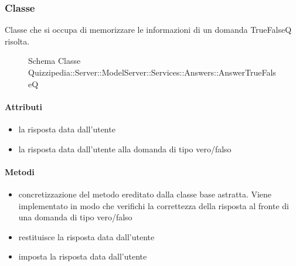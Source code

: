 \subsubsection{Classe }
Classe che si occupa di memorizzare le informazioni di un domanda TrueFalseQ risolta.
\begin{figure}[H]
\centering
\noindent{}
\caption[Schema Classe AnswerTrueFalseQ]{Schema Classe Quizzipedia::Server::ModelServer::Services::Answers::AnswerTrueFalseQ}
\end{figure}
\paragraph{Attributi}
\begin{itemize}
\item {}
\newline
la risposta data dall'utente
\item {}
\newline
la risposta data dall'utente alla domanda di tipo vero/falso
\end{itemize}
\paragraph{Metodi}
\begin{itemize}
\item {}
\newline
concretizzazione del metodo ereditato dalla classe base astratta. Viene implementato in modo che verifichi la correttezza della risposta al fronte di una domanda di tipo vero/falso
\newline
\item {}
\newline
restituisce la risposta data dall'utente
\newline
\item {}
\newline
imposta la risposta data dall'utente
\newline
\end{itemize}
